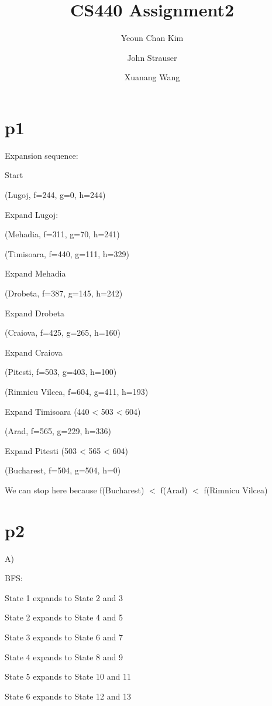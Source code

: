 \documentclass{article}
\author{Yeoun Chan Kim \and John Strauser \and Xuanang Wang}
\title{CS440 Assignment2}
\begin{document}
\maketitle

\section*{p1}

\hspace{5mm}

Expansion sequence:

Start

(Lugoj, f=244, g=0, h=244)

Expand Lugoj:

(Mehadia, f=311, g=70, h=241)

(Timisoara, f=440, g=111, h=329)

Expand Mehadia

(Drobeta, f=387, g=145, h=242)

Expand Drobeta

(Craiova, f=425, g=265, h=160)

Expand Craiova

(Pitesti, f=503, g=403, h=100)

(Rimnicu Vilcea, f=604, g=411, h=193)

Expand Timisoara (440 < 503 < 604)

(Arad, f=565, g=229, h=336)

Expand Pitesti (503 < 565 < 604)

(Bucharest, f=504, g=504, h=0) 

We can stop here because f(Bucharest) $<$ f(Arad) $<$ f(Rimnicu Vilcea)

\section*{p2}

\hspace{5mm}

A)

BFS:

State 1 expands to State 2 and 3

State 2 expands to State 4 and 5

State 3 expands to State 6 and 7

State 4 expands to State 8 and 9

State 5 expands to State 10 and 11

State 6 expands to State 12 and 13
\end{document}

